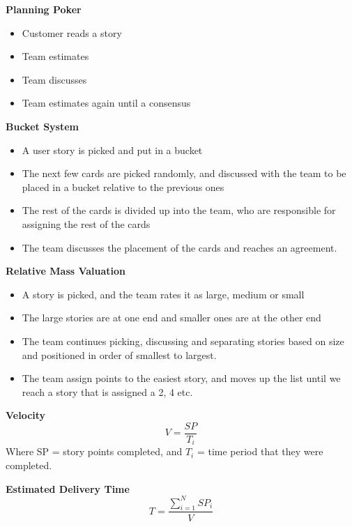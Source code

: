 \documentclass[a4paper,10pt]{article}
\begin{document}
\textcolor{BlueGreen}{\textbf{Planning Poker}} \\
\begin{itemize}
	\item Customer reads a story 
	\item Team estimates 
	\item Team discusses 
	\item Team estimates again until a consensus \\
\end{itemize}
\textcolor{BlueGreen}{\textbf{Bucket System}}
\begin{itemize}
	\item A user story is picked and put in a bucket 
	\item The next few cards are picked randomly, and discussed with the team to be placed in a bucket relative to the previous ones 
	\item The rest of the cards is divided up into the team, who are responsible for assigning the rest of the cards 
	\item The team discusses the placement of the cards and reaches an agreement. \\
\end{itemize}
\newpage 
\noindent \textcolor{BlueGreen}{\textbf{Relative Mass Valuation}}
\begin{itemize}
	\item A story is picked, and the team rates it as large, medium or small 
	\item The large stories are at one end and smaller ones are at the other end 
	\item The team continues picking, discussing and separating stories based on size and positioned in order of smallest to largest. 
	\item The team assign points to the easiest story, and moves up the list until we reach a story that is assigned a 2, 4 etc. 
\end{itemize}
\begin{shaded}
	\noindent \textcolor{Emerald}{\textbf{Velocity}} \\
	\begin{equation*}
		V = \dfrac{SP}{T_{i}}
	\end{equation*}
	Where SP = story points completed, and $T_{i}$ = time period that they were completed. 
\end{shaded}
\begin{shaded}
	\noindent \textcolor{Emerald}{\textbf{Estimated Delivery Time}} \\
	\begin{equation*}
		T = \dfrac{\sum_{i=1}^{N}SP_{i}}{V}
	\end{equation*}
\end{shaded} 
\end{document}
